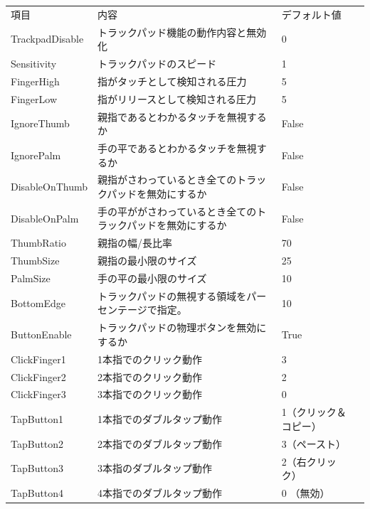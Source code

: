 \documentclass[mingoth,a4paper]{jsarticle}
\begin{document}
\begin{table}[htb]
  \begin{tabular}{lp{28em}lc}
    項目 & 内容 & デフォルト値 \\
    TrackpadDisable & トラックパッド機能の動作内容と無効化 & 0 \\
    Sensitivity & トラックパッドのスピード & 1 \\
    FingerHigh & 指がタッチとして検知される圧力 & 5 \\
    FingerLow & 指がリリースとして検知される圧力 & 5 \\
    IgnoreThumb & 親指であるとわかるタッチを無視するか & False \\
    IgnorePalm & 手の平であるとわかるタッチを無視するか & False \\
    DisableOnThumb & 親指がさわっているとき全てのトラックパッドを無効にするか & False \\
    DisableOnPalm & 手の平ががさわっているとき全てのトラックパッドを無効にするか & False \\
    ThumbRatio & 親指の幅/長比率 & 70 \\
    ThumbSize & 親指の最小限のサイズ & 25 \\
    PalmSize & 手の平の最小限のサイズ & 10 \\
    BottomEdge & トラックパッドの無視する領域をパーセンテージで指定。 & 10\\
    ButtonEnable & トラックパッドの物理ボタンを無効にするか & True \\
    ClickFinger1 & 1本指でのクリック動作 & 3 \\
    ClickFinger2 & 2本指でのクリック動作 & 2 \\
    ClickFinger3 & 3本指でのクリック動作 & 0 \\
    TapButton1 & 1本指でのダブルタップ動作 & 1（クリック＆コピー）\\
    TapButton2 & 2本指でのダブルタップ動作 & 3（ペースト）\\
    TapButton3 & 3本指のダブルタップ動作 & 2（右クリック）\\
    TapButton4 & 4本指でのダブルタップ動作 & 0 （無効）\\

\end{tabular}
\end{table}
\end{document}
